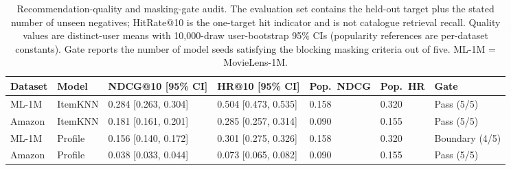 \begin{table}[H]
\centering\scriptsize
\setlength{\tabcolsep}{2.5pt}
\caption{Recommendation-quality and masking-gate audit. The evaluation set contains the held-out target plus the stated number of unseen negatives; HitRate@10 is the one-target hit indicator and is not catalogue retrieval recall. Quality values are distinct-user means with 10,000-draw user-bootstrap 95\% CIs (popularity references are per-dataset constants). Gate reports the number of model seeds satisfying the blocking masking criteria out of five. ML-1M = MovieLens-1M.}
\label{tab:recommendation-quality}
\begin{tabular}{@{}lllllll@{}}
\toprule
Dataset & Model & NDCG@10 [95\% CI] & HR@10 [95\% CI] & Pop.\ NDCG & Pop.\ HR & Gate \\
\midrule
ML-1M & ItemKNN & 0.284 [0.263, 0.304] & 0.504 [0.473, 0.535] & 0.158 & 0.320 & Pass (5/5) \\
Amazon & ItemKNN & 0.181 [0.161, 0.201] & 0.285 [0.257, 0.314] & 0.090 & 0.155 & Pass (5/5) \\
ML-1M & Profile & 0.156 [0.140, 0.172] & 0.301 [0.275, 0.326] & 0.158 & 0.320 & Boundary (4/5) \\
Amazon & Profile & 0.038 [0.033, 0.044] & 0.073 [0.065, 0.082] & 0.090 & 0.155 & Pass (5/5) \\
\bottomrule
\end{tabular}
\end{table}
